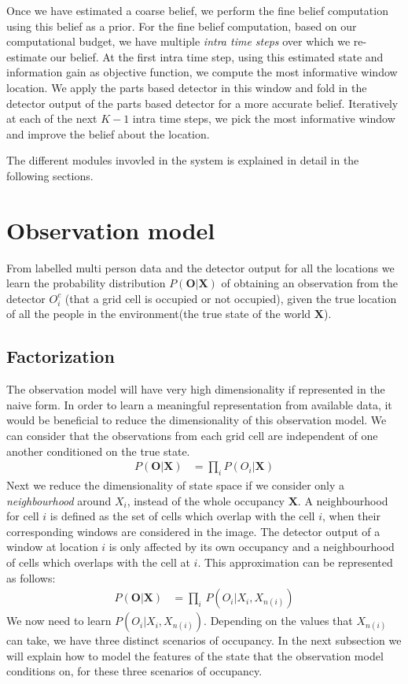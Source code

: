 \documentclass[10pt,twocolumn,letterpaper]{article}
\newcommand{\obs}{\mathbf{O}}
\newcommand{\state}{\mathbf{X}}
\begin{document}
Once we have estimated a coarse belief, we perform the fine belief computation using this belief as a prior.
For the fine belief computation, based on our computational budget, we have multiple \emph{intra time steps} over which we re-estimate our belief. 
At the first intra time step, using this estimated state and information gain as objective function, we compute the most informative window location.
We apply the parts based detector in this window and fold in the detector output of the parts based detector for a more accurate belief.
Iteratively at each of the next $K-1$ intra time steps, we pick the most informative window and improve the belief about the location.

The different modules invovled in the system is explained in detail in the following sections.

\section{Observation model} \label{sec:obs}
From labelled multi person data and the detector output for all the locations we learn the probability distribution $ P(\textbf{O}|\textbf{X})  $ of
obtaining an observation from the detector $ O^{c}_{i} $ (that a grid cell is occupied or not occupied), given the true location of all the people in the environment(the true state of the world $\textbf{X}$).

\subsection{Factorization}

The observation model will have very high dimensionality if represented in the naive form. In order to learn a meaningful representation from available data, it would be beneficial to reduce the dimensionality of this observation model.
We can consider that the observations from each grid cell are independent of one another conditioned on the true state.
\begin{align}
P(\textbf{O}|\textbf{X})&=\prod_{i} {P(O_{i}|\textbf{X})}
\end{align}
Next we reduce the dimensionality of state space if we consider only a \textit{neighbourhood} around $ X_{i} $, instead of the whole occupancy $\textbf{X} $. A neighbourhood for cell $i$ is defined as the set of cells which overlap with the cell $i$, when their corresponding windows are considered in the image. The detector output of a window at location $ i $ is only affected by its own occupancy and a neighbourhood of cells which overlaps with the cell at $ i$. This approximation can be represented as follows: 
\begin{align}
  P(\obs|\state) &= \prod_{i} \, P(O_{i}|X_{i},X_{n(i)})
\end{align}
We now need to learn  $ P(O_{i}|X_{i},X_{n(i)}) $. Depending on the values that $ X_{n(i)} $ can take, we have three distinct scenarios of occupancy. In the next subsection we will explain how to model the features of the state that the observation model conditions on, for these three scenarios of occupancy.
\end{document}
